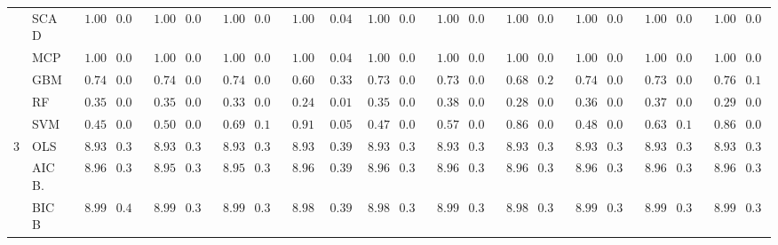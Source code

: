 \begin{tabular}{llllllllllllllllllllll}
	& SCAD  & $\phantom{0}1.00$ & $0.04$ & $\phantom{0}1.00$ & $0.04$ & $\phantom{0}1.00$ & $0.04$ & $\phantom{0}1.00$ & $\phantom{0}0.04$ & $\phantom{0}1.00$ & $0.04$ & $\phantom{0}1.00$ & $0.04$ & $\phantom{0}1.00$ & $0.04$ & $\phantom{0}1.00$ & $0.04$ & $\phantom{0}1.00$ & $0.04$ & $\phantom{0}1.00$ & $0.04$ \\
	& MCP  & $\phantom{0}1.00$ & $0.04$ & $\phantom{0}1.00$ & $0.04$ & $\phantom{0}1.00$ & $0.04$ & $\phantom{0}1.00$ & $\phantom{0}0.04$ & $\phantom{0}1.00$ & $0.04$ & $\phantom{0}1.00$ & $0.04$ & $\phantom{0}1.00$ & $0.04$ & $\phantom{0}1.00$ & $0.04$ & $\phantom{0}1.00$ & $0.04$ & $\phantom{0}1.00$ & $0.04$ \\
	& GBM  & $\phantom{0}0.74$ & $0.04$ & $\phantom{0}0.74$ & $0.04$ & $\phantom{0}0.74$ & $0.04$ & $\phantom{0}0.60$ & $\phantom{0}0.33$ & $\phantom{0}0.73$ & $0.04$ & $\phantom{0}0.73$ & $0.05$ & $\phantom{0}0.68$ & $0.27$ & $\phantom{0}0.74$ & $0.04$ & $\phantom{0}0.73$ & $0.04$ & $\phantom{0}0.76$ & $0.14$ \\
	& RF  & $\phantom{0}0.35$ & $0.01$ & $\phantom{0}0.35$ & $0.01$ & $\phantom{0}0.33$ & $0.01$ & $\phantom{0}0.24$ & $\phantom{0}0.01$ & $\phantom{0}0.35$ & $0.02$ & $\phantom{0}0.38$ & $0.01$ & $\phantom{0}0.28$ & $0.01$ & $\phantom{0}0.36$ & $0.01$ & $\phantom{0}0.37$ & $0.02$ & $\phantom{0}0.29$ & $0.01$ \\
	& SVM  & $\phantom{0}0.45$ & $0.03$ & $\phantom{0}0.50$ & $0.05$ & $\phantom{0}0.69$ & $0.11$ & $\phantom{0}0.91$ & $\phantom{0}0.05$ & $\phantom{0}0.47$ & $0.06$ & $\phantom{0}0.57$ & $0.08$ & $\phantom{0}0.86$ & $0.06$ & $\phantom{0}0.48$ & $0.03$ & $\phantom{0}0.63$ & $0.10$ & $\phantom{0}0.86$ & $0.06$ \\
	3 & OLS  & $\phantom{0}8.93$ & $0.39$ & $\phantom{0}8.93$ & $0.39$ & $\phantom{0}8.93$ & $0.39$ & $\phantom{0}8.93$ & $\phantom{0}0.39$ & $\phantom{0}8.93$ & $0.39$ & $\phantom{0}8.93$ & $0.39$ & $\phantom{0}8.93$ & $0.39$ & $\phantom{0}8.93$ & $0.39$ & $\phantom{0}8.93$ & $0.39$ & $\phantom{0}8.93$ & $0.39$ \\
	& AIC B.  & $\phantom{0}8.96$ & $0.39$ & $\phantom{0}8.95$ & $0.39$ & $\phantom{0}8.95$ & $0.39$ & $\phantom{0}8.96$ & $\phantom{0}0.39$ & $\phantom{0}8.96$ & $0.39$ & $\phantom{0}8.96$ & $0.39$ & $\phantom{0}8.96$ & $0.39$ & $\phantom{0}8.96$ & $0.39$ & $\phantom{0}8.96$ & $0.39$ & $\phantom{0}8.96$ & $0.39$ \\
	& BIC B  & $\phantom{0}8.99$ & $0.40$ & $\phantom{0}8.99$ & $0.39$ & $\phantom{0}8.99$ & $0.39$ & $\phantom{0}8.98$ & $\phantom{0}0.39$ & $\phantom{0}8.98$ & $0.39$ & $\phantom{0}8.99$ & $0.39$ & $\phantom{0}8.98$ & $0.39$ & $\phantom{0}8.99$ & $0.39$ & $\phantom{0}8.99$ & $0.39$ & $\phantom{0}8.99$ & $0.39$ \\

\end{tabular}
